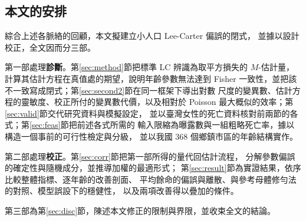 \subsection{本文的安排}\label{sec:roadmap}

綜合上述各脈絡的回顧，本文擬建立小人口 Lee-Carter 偏誤的閉式，
並據以設計校正，全文因而分三部。

第一部處理\textbf{診斷}。第\ref{sec:method}節把標準 LC 辨識為取平方損失的
$M$-估計量，計算其估計方程在真值處的期望，說明年齡參數無法達到 Fisher
一致性，並把該不一致寫成閉式；第\ref{sec:second2}節在同一框架下導出對數
尺度的變異數、估計方程的靈敏度、校正所付的變異數代價，以及相對於 Poisson
最大概似的效率；第\ref{sec:valid}節交代研究資料與模擬設定，
並以臺灣女性的死亡資料核對前兩節的各式；第\ref{sec:feas}節把前述各式所需的
輸入限縮為曝露數與一組粗略死亡率，據以構造一個事前的可行性檢定與分級，
並以我國 368 個鄉鎮市區的年齡結構實作。

第二部處理\textbf{校正}。第\ref{sec:corr}節把第一部所得的量代回估計流程，
分解參數偏誤的確定性與隨機成分，並推導加權的最適形式；
第\ref{sec:result}節為實證結果，依序比較整體指標、逐年齡的改善剖面、
平均餘命的偏誤與離散、與參考母體修勻法的對照、模型誤設下的穩健性，
以及兩項改善得以疊加的條件。

第三部為第\ref{sec:disc}節，陳述本文修正的限制與界限，並收束全文的結論。


